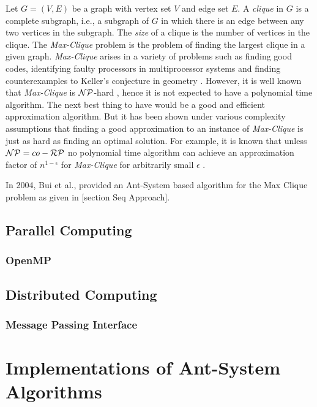 \documentclass[11pt]{article}
\begin{document}
Let $G=(V,E)$ be a graph with vertex set $V$ and edge set $E$.  A {\it clique}
in $G$ is a complete subgraph, i.e., a subgraph of $G$ in which there is an
edge between any two vertices in the subgraph.  The {\it size} of a clique is
the number of vertices in the clique.  The \textit{Max-Clique} problem is the problem of
finding the largest clique in a given graph.  \textit{Max-Clique} arises in a variety of
problems such as finding good codes, identifying faulty processors in
multiprocessor systems and finding counterexamples to Keller's conjecture in
geometry \cite{BP2}\cite{Sloane}\cite{SMW}\cite{Keller}\cite{LS}.  However, it
is well known that \textit{Max-Clique} is $\cal NP$-hard \cite{GJ}, hence it is not
expected to have a polynomial time algorithm.  The next best thing to have
would be a good and efficient approximation algorithm.  But it has been shown
under various complexity assumptions that finding a good approximation to an
instance of \textit{Max-Clique} is just as hard as finding an optimal solution.  For
example, it is known that unless ${\cal NP}= co-{\cal RP}$ no polynomial time
algorithm can achieve an approximation factor of $n^{1-\epsilon}$ for
\textit{Max-Clique} for arbitrarily small $\epsilon$ \cite{Hastad}.  %

In 2004, Bui et al., provided an Ant-System based algorithm for the Max Clique problem as given 
in [section Seq Approach].


\subsection{Parallel Computing}\label{par_comp}
\subsubsection{OpenMP}

\subsection{Distributed Computing}\label{dist_comp} 
\subsubsection{Message Passing Interface}


\section{Implementations of Ant-System Algorithms}\label{alg}
\end{document}
